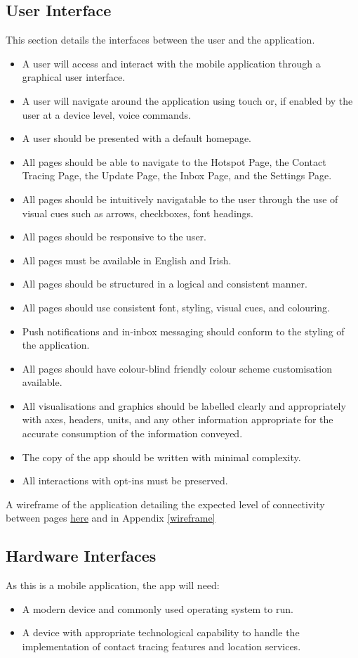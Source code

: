 \documentclass{scrreprt}
\begin{document}
\subsection{User Interface}\label{Interfaces}
This section details the interfaces between the user and the application.
\begin{itemize}
	\item A user will access and interact with the mobile application through a graphical user interface.
	\item A user will navigate around the application using touch or, if enabled by the user at a device level, voice commands.
	\item A user should be presented with a default homepage.
	\item All pages should be able to navigate to the Hotspot Page, the Contact Tracing Page, the Update Page, the Inbox Page, and the Settings Page.
	\item All pages should be intuitively navigatable to the user through the use of visual cues such as arrows, checkboxes, font headings.
	\item All pages should be responsive to the user.
	\item All pages must be available in English and Irish.
	\item All pages should be structured in a logical and consistent manner.
	\item All pages should use consistent font, styling, visual cues, and colouring.
	\item Push notifications and in-inbox messaging should conform to the styling of the application.
	\item All pages should have colour-blind friendly colour scheme customisation available.
	\item All visualisations and graphics should be labelled clearly and appropriately with axes, headers, units, and any other information appropriate for the accurate consumption of the information conveyed.
	\item The copy of the app should be written with minimal complexity.
	\item All interactions with opt-ins must be preserved.
\end{itemize}
A wireframe of the application detailing the expected level of connectivity between pages \href{https://www.fluidui.com/editor/live/project/p_5m9EtaKvry2LGyTzKWLHsE64PqSvu3rX}{here} and in Appendix \ref{wireframe}


\subsection{Hardware Interfaces}\label{HardInterface}
As this is a mobile application, the app will need:
\begin{itemize}
	\item A modern device and commonly used operating system to run.
	\item A device with appropriate technological capability to handle the implementation of contact tracing features and location services.
\end{itemize}
 
\end{document}
